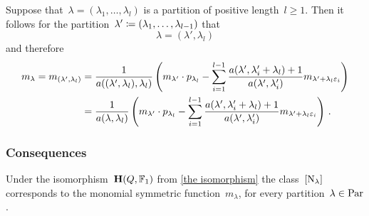 \documentclass[a4paper, 11pt, twoside=semi]{scrartcl}
\begin{document}
Suppose that~$\lambda = (\lambda_1, \dotsc, \lambda_l)$ is a partition of positive length~$l \geq 1$.
Then it follows for the partition~$\lambda' \coloneqq (\lambda_1, \dotsc, \lambda_{l-1})$ that
\[
  \lambda = (\lambda', \lambda_l)
\]
and therefore
\begin{align}
  m_\lambda
  =
  m_{(\lambda', \lambda_l)}
  &=
  \frac{1}{a((\lambda', \lambda_l), \lambda_l)}
  \left(
    m_{\lambda'} \cdot p_{\lambda_l}
    -
    \sum_{i=1}^{l-1}
    \frac{ a(\lambda', \lambda'_i + \lambda_l) + 1 }{ a(\lambda', \lambda'_i) } 
    m_{\lambda' + \lambda_l \varepsilon_i}
  \right)
  \notag
  \\
  &=
  \frac{1}{a(\lambda, \lambda_l)}
  \left(
    m_{\lambda'} \cdot p_{\lambda_l}
    -
    \sum_{i=1}^{l-1}
    \frac{ a(\lambda', \lambda'_i + \lambda_l) + 1 }{ a(\lambda', \lambda'_i) } 
    m_{\lambda' + \lambda_l \varepsilon_i}
  \right) \,.
  \label{identity for polynomials}
\end{align}

\subsubsection{Consequences}

\begin{proposition}
  Under the isomorphism~$\mathbf{H}(Q, \mathbb{F}_1)$ from \cref{the isomorphism} the class~$[ \mathrm{N}_\lambda ]$ corresponds to the monomial symmetric function~$m_\lambda$, for every partition~$\lambda \in \mathrm{Par}$.
\end{proposition}
\end{document}
